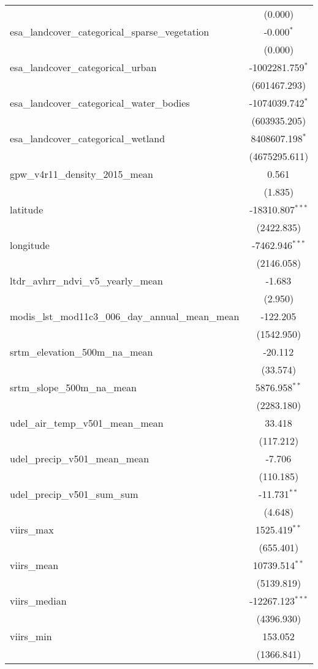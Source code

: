 \begin{table}[!htbp]
\begin{tabular}{@{\extracolsep{5pt}}lc}
  & (0.000) \\
 esa_landcover_categorical_sparse_vegetation & -0.000$^{*}$ \\
  & (0.000) \\
 esa_landcover_categorical_urban & -1002281.759$^{*}$ \\
  & (601467.293) \\
 esa_landcover_categorical_water_bodies & -1074039.742$^{*}$ \\
  & (603935.205) \\
 esa_landcover_categorical_wetland & 8408607.198$^{*}$ \\
  & (4675295.611) \\
 gpw_v4r11_density_2015_mean & 0.561$^{}$ \\
  & (1.835) \\
 latitude & -18310.807$^{***}$ \\
  & (2422.835) \\
 longitude & -7462.946$^{***}$ \\
  & (2146.058) \\
 ltdr_avhrr_ndvi_v5_yearly_mean & -1.683$^{}$ \\
  & (2.950) \\
 modis_lst_mod11c3_006_day_annual_mean_mean & -122.205$^{}$ \\
  & (1542.950) \\
 srtm_elevation_500m_na_mean & -20.112$^{}$ \\
  & (33.574) \\
 srtm_slope_500m_na_mean & 5876.958$^{**}$ \\
  & (2283.180) \\
 udel_air_temp_v501_mean_mean & 33.418$^{}$ \\
  & (117.212) \\
 udel_precip_v501_mean_mean & -7.706$^{}$ \\
  & (110.185) \\
 udel_precip_v501_sum_sum & -11.731$^{**}$ \\
  & (4.648) \\
 viirs_max & 1525.419$^{**}$ \\
  & (655.401) \\
 viirs_mean & 10739.514$^{**}$ \\
  & (5139.819) \\
 viirs_median & -12267.123$^{***}$ \\
  & (4396.930) \\
 viirs_min & 153.052$^{}$ \\
  & (1366.841) \\

\end{tabular}
\end{table}
